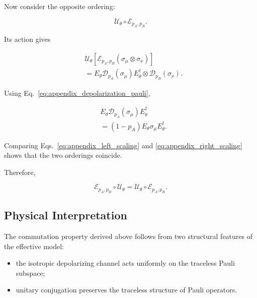 \medskip

Now consider the opposite ordering:

\begin{equation}
\mathcal{U}_{\theta}
\circ
\mathcal{E}_{p_A,p_B}.
\end{equation}

Its action gives

\begin{align}
&
\mathcal{U}_{\theta}
\left[
\mathcal{E}_{p_A,p_B}
\left(
\sigma_{\mu}\otimes\sigma_{\nu}
\right)
\right]
\nonumber
\\
&=
E_{\theta}
\mathcal{D}_{p_A}(\sigma_{\mu})
E_{\theta}^{\dagger}
\otimes
\mathcal{D}_{p_B}(\sigma_{\nu}).
\label{eq:appendix_right_order}
\end{align}

Using Eq.~\eqref{eq:appendix_depolarization_pauli},

\begin{align}
&
E_{\theta}
\mathcal{D}_{p_A}(\sigma_{\mu})
E_{\theta}^{\dagger}
\nonumber
\\
&=
(1-p_A)
E_{\theta}\sigma_{\mu}E_{\theta}^{\dagger}.
\label{eq:appendix_right_scaling}
\end{align}

Comparing Eqs.~\eqref{eq:appendix_left_scaling} and
\eqref{eq:appendix_right_scaling} shows that the two orderings coincide.

\medskip

Therefore,

\begin{equation}
\mathcal{E}_{p_A,p_B}
\circ
\mathcal{U}_{\theta}
=
\mathcal{U}_{\theta}
\circ
\mathcal{E}_{p_A,p_B}.
\label{eq:appendix_final_commutation}
\end{equation}


\subsection*{Physical Interpretation}

The commutation property derived above follows from two structural features of the effective model:

\begin{itemize}

\item the isotropic depolarizing channel acts uniformly on the traceless Pauli subspace;

\item unitary conjugation preserves the traceless structure of Pauli operators.

\end{itemize}


